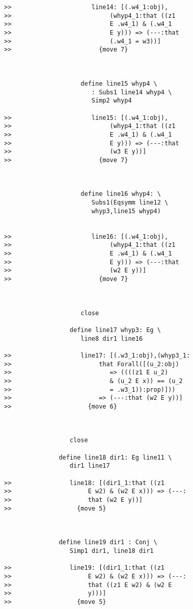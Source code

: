 \documentclass[12pt]{article}
\begin{document}
\begin{verbatim}
>>                      line14: [(.w4_1:obj),
>>                           (whyp4_1:that ((z1
>>                           E .w4_1) & (.w4_1
>>                           E y))) => (---:that
>>                           (.w4_1 = w3))]
>>                        {move 7}



                     define line15 whyp4 \
                        : Subs1 line14 whyp4 \
                        Simp2 whyp4

>>                      line15: [(.w4_1:obj),
>>                           (whyp4_1:that ((z1
>>                           E .w4_1) & (.w4_1
>>                           E y))) => (---:that
>>                           (w3 E y))]
>>                        {move 7}



                     define line16 whyp4: \
                        Subs1(Eqsymm line12 \
                        whyp3,line15 whyp4)


>>                      line16: [(.w4_1:obj),
>>                           (whyp4_1:that ((z1
>>                           E .w4_1) & (.w4_1
>>                           E y))) => (---:that
>>                           (w2 E y))]
>>                        {move 7}



                     close

                  define line17 whyp3: Eg \
                     line8 dir1 line16

>>                   line17: [(.w3_1:obj),(whyp3_1:
>>                        that Forall([(u_2:obj)
>>                           => ((((z1 E u_2)
>>                           & (u_2 E x)) == (u_2
>>                           = .w3_1)):prop)]))
>>                        => (---:that (w2 E y))]
>>                     {move 6}



                  close

               define line18 dir1: Eg line11 \
                  dir1 line17

>>                line18: [(dir1_1:that ((z1
>>                     E w2) & (w2 E x))) => (---:
>>                     that (w2 E y))]
>>                  {move 5}



               define line19 dir1 : Conj \
                  Simp1 dir1, line18 dir1

>>                line19: [(dir1_1:that ((z1
>>                     E w2) & (w2 E x))) => (---:
>>                     that ((z1 E w2) & (w2 E
>>                     y)))]
>>                  {move 5}




\end{verbatim}
\end{document}

